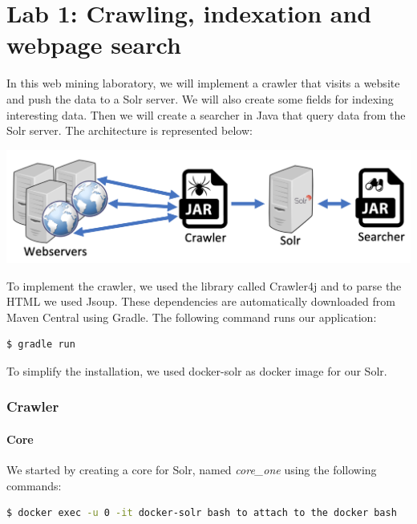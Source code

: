 \documentclass[a4paper]{article}
\begin{document}
\part*{Lab 1: Crawling, indexation and webpage search}
In this web mining laboratory, we will implement a crawler that visits a website and push the data to a Solr server. We will also create some fields for indexing interesting data. Then we will create a searcher in Java that query data from the Solr server. The architecture is represented below: \\

\begin{center}
	\includegraphics[scale=0.5]{architecture.png}
\end{center}

To implement the crawler, we used the library called Crawler4j and to parse the HTML we used Jsoup. These dependencies are automatically downloaded from Maven Central using Gradle. The following command runs our application: \\

\begin{lstlisting}[language=sh]
	$ gradle run
\end{lstlisting}

\vspace{6pt}

To simplify the installation, we used docker-solr as docker image for our Solr.

\section{Crawler}
\subsection{Core}
We started by creating a core for Solr, named \textit{core\_one} using the following commands:\\

\begin{lstlisting}[language=sh]
$ docker exec -u 0 -it docker-solr bash to attach to the docker bash
\end{lstlisting}
\end{document}
